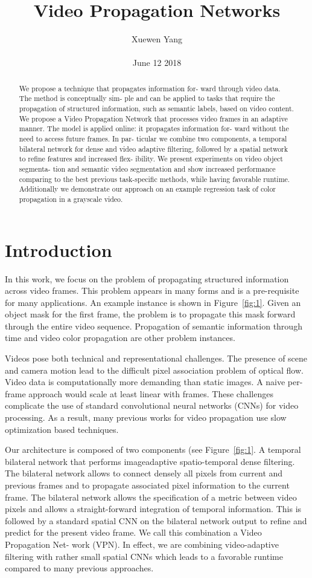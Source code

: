 \documentclass[10pt,twocolumn,letterpaper]{article}
\author{Xuewen Yang\\\\
June 12 2018}
\title{Video Propagation Networks}
\begin{document}
\maketitle
\begin{abstract}
We propose a technique that propagates information for-
ward through video data. The method is conceptually sim-
ple and can be applied to tasks that require the propagation
of structured information, such as semantic labels, based
on video content. We propose a Video Propagation Network
that processes video frames in an adaptive manner.
The model is applied online: it propagates information for-
ward without the need to access future frames. In par-
ticular we combine two components, a temporal bilateral
network for dense and video adaptive filtering, followed
by a spatial network to refine features and increased flex-
ibility. We present experiments on video object segmenta-
tion and semantic video segmentation and show increased
performance comparing to the best previous task-specific
methods, while having favorable runtime. Additionally we
demonstrate our approach on an example regression task of
color propagation in a grayscale video.
\end{abstract}
\section{Introduction}
In this work, we focus on the problem of propagating
structured information across video frames. This problem
appears in many forms and is a pre-requisite for many applications.
An example instance is shown in Figure~\ref{fig:1}. Given an object
mask for the first frame, the problem is to propagate this
mask forward through the entire video sequence. Propagation
of semantic information through time and video color
propagation are other problem instances.

Videos pose both technical and representational challenges.
The presence of scene and camera motion lead to
the difficult pixel association problem of optical flow. Video
data is computationally more demanding than static images.
A naive per-frame approach would scale at least linear with
frames. These challenges complicate the use of standard
convolutional neural networks (CNNs) for video processing.
As a result, many previous works for video propagation
use slow optimization based techniques.

Our architecture is composed of two components (see
Figure~\ref{fig:1}. A temporal bilateral network that performs imageadaptive
spatio-temporal dense filtering. The bilateral network
allows to connect densely all pixels from current and
previous frames and to propagate associated pixel information
to the current frame. The bilateral network allows
the specification of a metric between video pixels and allows
a straight-forward integration of temporal information.
This is followed by a standard spatial CNN on the bilateral
network output to refine and predict for the present video
frame. We call this combination a Video Propagation Net-
work (VPN). In effect, we are combining video-adaptive filtering
with rather small spatial CNNs which leads to a favorable
runtime compared to many previous approaches.
\end{document}
